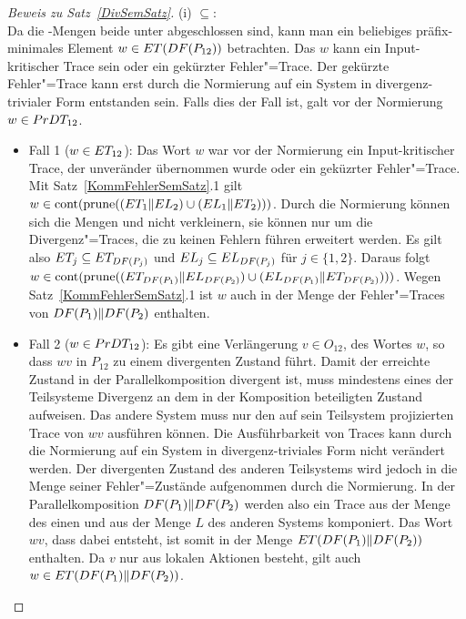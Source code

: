 \begin{proof}[Beweis zu Satz~\ref{DivSemSatz}]
  (i) \glqq $\subseteq$\grqq{}:\\
  Da die \ET{}-Mengen beide unter \cont{} abgeschlossen sind, kann man ein
  beliebiges präfix-minimales Element $w\in ET (DF (P_{12}))$ betrachten.
  Das $w$ kann ein Input-kritischer Trace sein oder ein gekürzter
  Fehler"=Trace. Der gekürzte Fehler"=Trace kann erst durch die Normierung auf
  ein System in divergenz-trivialer Form entstanden sein. Falls dies der Fall
  ist, galt vor der Normierung $w\in PrDT _{12}$.
  \begin{itemize}
    \item Fall 1 ($w\in ET _{12}$): Das Wort $w$ war vor der Normierung ein
      Input-kritischer Trace, der unveränder übernommen wurde oder ein
      geküzrter Fehler"=Trace. Mit Satz~\ref{KommFehlerSemSatz}.1 gilt $w\in
      \mathrm{cont} (\mathrm{prune} ((ET _1\|EL _2)\cup (EL _1\|ET _2)))$. Durch die
      Normierung können sich die Mengen \ET{} und \EL{} nicht verkleinern, sie
      können nur um die Divergenz"=Traces, die zu keinen Fehlern führen
      erweitert werden. Es gilt also $ET _j \subseteq ET _{DF (P_j)}$ und
      $EL _j \subseteq EL _{DF (P_j)}$ für $j\in \{1,2\}$. Daraus folgt
      $w\in \mathrm{cont} (\mathrm{prune} ((ET _{DF (P_1)}\|EL _{DF (P_2)})\cup (EL _{DF
      (P_1)}\|ET _{DF (P_2)})))$. Wegen Satz~\ref{KommFehlerSemSatz}.1 ist
      $w$ auch in der Menge der Fehler"=Traces von $DF (P_1)\|DF (P_2)$
      enthalten.
    \item Fall 2 ($w\in PrDT _{12}$): Es gibt eine Verlängerung $v\in
      O_{12}$, des Wortes $w$, so dass $wv$ in $P_{12}$ zu einem divergenten
      Zustand führt. Damit der erreichte Zustand in der Parallelkomposition
      divergent ist, muss mindestens eines der Teilsysteme Divergenz an dem
      in der Komposition beteiligten Zustand aufweisen. Das andere System
      muss nur den auf sein Teilsystem projizierten Trace von $wv$ ausführen
      können. Die Ausführbarkeit von Traces kann durch die Normierung auf ein
      System in divergenz-triviales Form nicht verändert werden. Der
      divergenten Zustand des anderen Teilsystems wird jedoch in die Menge
      seiner Fehler"=Zustände aufgenommen durch die Normierung. In der
      Parallelkomposition $DF (P_1)\|DF (P_2)$ werden also ein Trace aus
      der Menge \ET{} des einen und aus der Menge $L$ des anderen Systems
      komponiert. Das Wort $wv$, dass dabei entsteht, ist somit in der Menge
      $ET (DF (P_1)\|DF (P_2))$ enthalten. Da $v$ nur aus lokalen Aktionen
      besteht, gilt auch $w\in ET (DF (P_1)\|DF (P_2))$.
  \end{itemize}


\end{proof}
